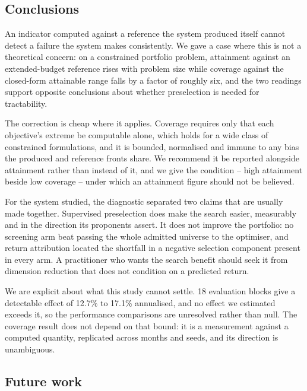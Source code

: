 \documentclass[preprint,11pt,authoryear]{elsarticle}
\begin{document}
\subsection{Conclusions}\label{sec:conclusions}

An indicator computed against a reference the system produced itself cannot detect a failure the system makes consistently. We gave a case where this is not a theoretical concern: on a constrained portfolio problem, attainment against an extended-budget reference rises with problem size while coverage against the closed-form attainable range falls by a factor of roughly six, and the two readings support opposite conclusions about whether preselection is needed for tractability.

The correction is cheap where it applies. Coverage requires only that each objective's extreme be computable alone, which holds for a wide class of constrained formulations, and it is bounded, normalised and immune to any bias the produced and reference fronts share. We recommend it be reported alongside attainment rather than instead of it, and we give the condition -- high attainment beside low coverage -- under which an attainment figure should not be believed.

For the system studied, the diagnostic separated two claims that are usually made together. Supervised preselection does make the search easier, measurably and in the direction its proponents assert. It does not improve the portfolio: no screening arm beat passing the whole admitted universe to the optimiser, and return attribution located the shortfall in a negative selection component present in every arm. A practitioner who wants the search benefit should seek it from dimension reduction that does not condition on a predicted return.

We are explicit about what this study cannot settle. 18 evaluation blocks give a detectable effect of 12.7\% to 17.1\% annualised, and no effect we estimated exceeds it, so the performance comparisons are unresolved rather than null. The coverage result does not depend on that bound: it is a measurement against a computed quantity, replicated across months and seeds, and its direction is unambiguous.


\subsection{Future work}\label{sec:future-work}
\end{document}
